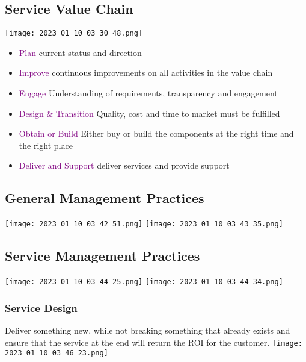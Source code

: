 \documentclass[main.tex,fontsize=12pt,paper=a4,paper=landscape,DIV=calc,]{scrartcl}
\begin{document}
\begin{multicols*}{2}
\subsection{Service Value Chain}
\texttt{[image: 2023\_01\_10\_03\_30\_48.png]}\newline
\begin{itemize}
\item \textcolor{purple}{Plan}\newline
  current status and direction
\item \textcolor{purple}{Improve}\newline
  continuous improvements on all activities in the value chain
\item \textcolor{purple}{Engage}\newline
  Understanding of requirements, transparency and engagement
\item \textcolor{purple}{Design \& Transition}\newline
  Quality, cost and time to market must be fulfilled
\item \textcolor{purple}{Obtain or Build}\newline
  Either buy or build the components at the right time and the right place
\item \textcolor{purple}{Deliver and Support}\newline
  deliver services and provide support
\end{itemize} 

\subsection{General Management Practices}
\texttt{[image: 2023\_01\_10\_03\_42\_51.png]}\newline
\texttt{[image: 2023\_01\_10\_03\_43\_35.png]}

\subsection{Service Management Practices}
\texttt{[image: 2023\_01\_10\_03\_44\_25.png]}\newline
\texttt{[image: 2023\_01\_10\_03\_44\_34.png]}

\subsubsection{Service Design}
Deliver something new, while not breaking something that already exists and ensure that the service at the end will return the ROI for the customer.\newline
\texttt{[image: 2023\_01\_10\_03\_46\_23.png]}


\end{multicols*}
\end{document}
